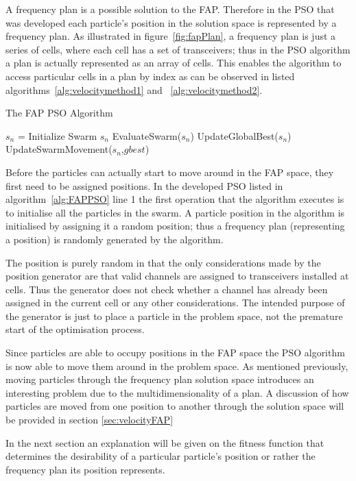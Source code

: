A frequency plan is a possible solution to the FAP. Therefore in the PSO that was developed each particle's position in the solution space is represented by a frequency plan. As illustrated in figure~\ref{fig:fapPlan}, a frequency plan is just a series of cells, where each cell has a set of transceivers; thus in the PSO algorithm a plan is actually represented as an array of cells. This enables the algorithm to access particular cells in a plan by index as can be observed in listed algorithms~\ref{alg:velocitymethod1} and ~\ref{alg:velocitymethod2}. 

\begin{algorithm}
\label{alg:FAPPSO}
\caption{The FAP PSO Algorithm}
\begin{algorithmic}
\State $s_n$ = Initialize Swarm $s_n$
	\State EvaluateSwarm($s_n$)
	\State UpdateGlobalBest($s_n$)
	\State UpdateSwarmMovement($s_n$,$gbest$)
\EndWhile
\end{algorithmic}
\end{algorithm}

Before the particles can actually start to move around in the FAP space, they first need to be assigned positions. In the developed PSO listed in algorithm~\ref{alg:FAPPSO} line 1 the first operation that the algorithm executes is to initialise all the particles in the swarm. A particle position in the algorithm is initialised by assigning it a random position; thus a frequency plan (representing a position) is randomly generated by the algorithm.

The position is purely random in that the only considerations made by the position generator are that valid channels are assigned to transceivers installed at cells. Thus the generator does not check whether a channel has already been assigned in the current cell or any other considerations. The intended purpose of the generator is just to place a particle in the problem space, not the premature start of the optimisation process.

Since particles are able to occupy positions in the FAP space the PSO algorithm is now able to move them around in the problem space. As mentioned previously, moving particles through the frequency plan solution space introduces an interesting problem due to the multidimensionality of a plan. A discussion of how particles are moved from one position to another through the solution space will be provided in section \ref{sec:velocityFAP}

In the next section an explanation will be given on the fitness function that determines the desirability of a particular particle's position or rather the frequency plan its position represents.
